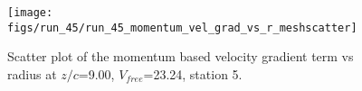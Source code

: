 \begin{figure}[H]
\centering
\texttt{[image: figs/run\_45/run\_45\_momentum\_vel\_grad\_vs\_r\_meshscatter]}
\caption{Scatter plot of the momentum based velocity gradient term vs radius at $z/c$=9.00, $V_{free}$=23.24, station 5.}
\label{fig:run_45_momentum_vel_grad_vs_r_meshscatter}
\end{figure}



